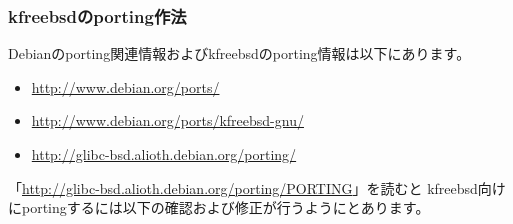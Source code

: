 \documentclass[mingoth,a4paper]{jsarticle}
\begin{document}
\subsubsection{kfreebsdのporting作法}
Debianのporting関連情報およびkfreebsdのporting情報は以下にあります。

\begin{itemize}
 \item{\url{http://www.debian.org/ports/}}
 \item{\url{http://www.debian.org/ports/kfreebsd-gnu/}}
 \item{\url{http://glibc-bsd.alioth.debian.org/porting/}}
\end{itemize}

「\url{http://glibc-bsd.alioth.debian.org/porting/PORTING}」を読むと
kfreebsd向けにportingするには以下の確認および修正が行うようにとあります。
\end{document}
